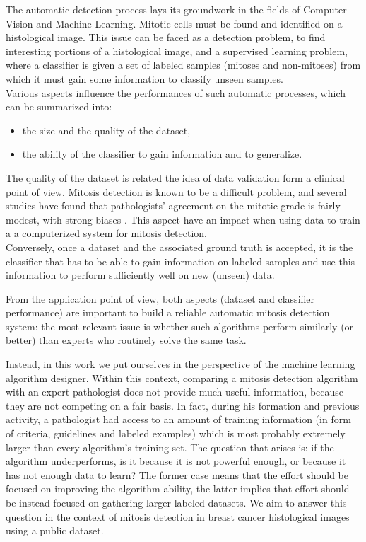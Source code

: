 The automatic detection process lays its groundwork in the fields of Computer Vision and Machine Learning\cite{mitosisBreastCancerImagingAlgorithmsTHESIS}.
Mitotic cells must be found and identified on a histological image. This issue can be faced as a
detection problem, to find interesting portions of a histological image, and a supervised learning problem, where a classifier
is given a set of labeled samples (mitoses and non-mitoses) from which it must gain some information to classify unseen samples.\\


\noindent Various aspects influence the performances of such automatic processes, which can be summarized into:

\begin{itemize}
 \item the size and the quality of the dataset,
 \item the ability of the classifier to gain information and to generalize.
\end{itemize}

The quality of the dataset is related the idea of data validation form a clinical point of view. Mitosis detection is known to be
a difficult problem, and several studies have found that pathologists' agreement on the mitotic grade is fairly modest, with strong biases \cite{mitoticRecognition03Agreement}.
This aspect have an impact when using data to train a a computerized system for mitosis detection.\\
Conversely, once a dataset and the associated ground truth is accepted, it is the classifier that has to be able to gain information on labeled samples and
use this information to perform sufficiently well on new (unseen) data.

\vspace{0.5cm}

From the application point of view, both aspects (dataset and classifier performance) are important to build a reliable automatic mitosis detection system:
the most relevant issue is whether such algorithms perform similarly (or better) than experts who routinely solve the same task.

Instead, in this work we put ourselves in the perspective of the machine learning algorithm designer. Within this context, comparing a
mitosis detection algorithm with an expert pathologist does not provide
much useful information, because they are not competing on a fair basis. In fact, during
his formation and previous activity, a pathologist had access to an amount of training information (in form of criteria, guidelines and labeled examples) which is
most probably extremely larger than every algorithm's training set. The question that arises is: if the algorithm
underperforms, is it because it is not powerful enough, or because it has not enough data to learn?
The former case means that the effort should be focused on improving the algorithm ability, the latter implies that effort should be instead focused on gathering larger labeled datasets.
We aim to answer this question in the context of mitosis detection in breast
cancer histological images using a public dataset.

